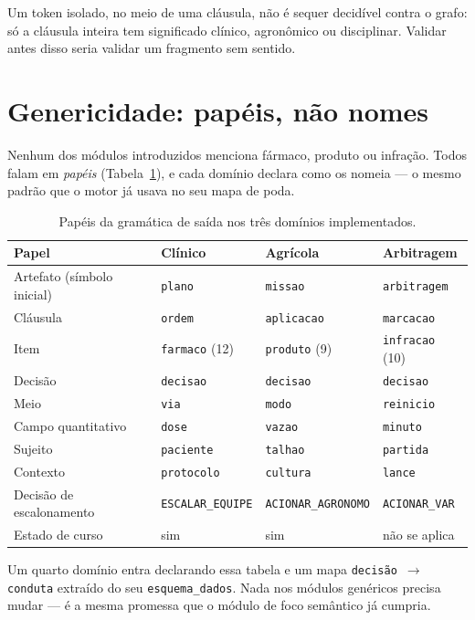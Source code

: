 \documentclass[11pt,a4paper]{article}
\begin{document}
Um token isolado, no meio de uma cláusula, não é sequer decidível contra o
grafo: só a cláusula inteira tem significado clínico, agronômico ou disciplinar.
Validar antes disso seria validar um fragmento sem sentido.


\section{Genericidade: papéis, não nomes}

Nenhum dos módulos introduzidos menciona fármaco, produto ou infração. Todos
falam em \emph{papéis} (Tabela~\ref{tab:papeis}), e cada domínio declara como os
nomeia --- o mesmo padrão que o motor já usava no seu mapa de poda.

\begin{table}[htbp]
\centering
\small
\caption{Papéis da gramática de saída nos três domínios implementados.}
\label{tab:papeis}
\begin{tabular}{@{}llll@{}}
\toprule
\textbf{Papel} & \textbf{Clínico} & \textbf{Agrícola} & \textbf{Arbitragem} \\
\midrule
Artefato (símbolo inicial) & \texttt{plano} & \texttt{missao} & \texttt{arbitragem} \\
Cláusula & \texttt{ordem} & \texttt{aplicacao} & \texttt{marcacao} \\
Item & \texttt{farmaco} (12) & \texttt{produto} (9) & \texttt{infracao} (10) \\
Decisão & \texttt{decisao} & \texttt{decisao} & \texttt{decisao} \\
Meio & \texttt{via} & \texttt{modo} & \texttt{reinicio} \\
Campo quantitativo & \texttt{dose} & \texttt{vazao} & \texttt{minuto} \\
Sujeito & \texttt{paciente} & \texttt{talhao} & \texttt{partida} \\
Contexto & \texttt{protocolo} & \texttt{cultura} & \texttt{lance} \\
Decisão de escalonamento & \texttt{ESCALAR\_EQUIPE} & \texttt{ACIONAR\_AGRONOMO} & \texttt{ACIONAR\_VAR} \\
Estado de curso & sim & sim & não se aplica \\
\bottomrule
\end{tabular}
\end{table}

Um quarto domínio entra declarando essa tabela e um mapa
\texttt{decisão $\rightarrow$ conduta} extraído do seu \texttt{esquema\_dados}.
Nada nos módulos genéricos precisa mudar --- é a mesma promessa que o módulo de
foco semântico já cumpria.
\end{document}
